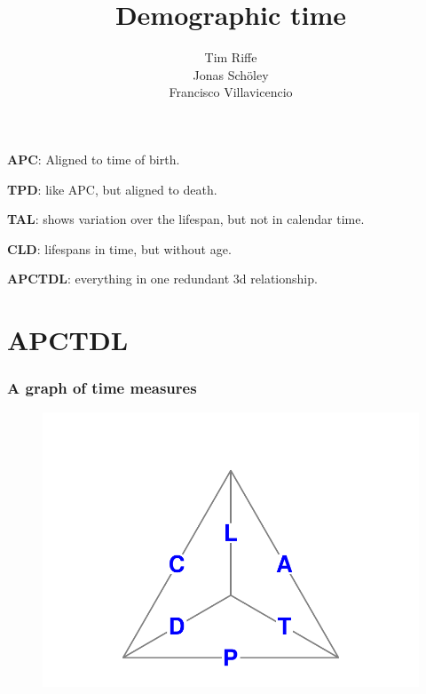 \documentclass[20pt]{beamer}
\title{Demographic time}
\subtitle{Tim Riffe\\ Jonas Sch{\"o}ley \\ Francisco Villavicencio}		%
\begin{document}
\begin{frame}
	\titlepage
\end{frame}

\begin{frame}%
  \begin{description}
    \item<1->{\textbf{APC}:} Aligned to time of birth.
    \item<2->{\textbf{TPD}:} like APC, but aligned to death.
    \item<3->{\textbf{TAL}:} shows variation over the lifespan, but not in
    calendar time.
    \item<4->{\textbf{CLD}:} lifespans in time, but without age.
    \item<5->{\textbf{APCTDL}:} everything in one redundant 3d relationship.
  \end{description}
\end{frame}

\section{APCTDL}
\begin{frame}
\frametitle{A graph of time measures}
\begin{figure}[b]
    \centering
    \includegraphics{Figures/Tetra1prg.pdf}
\end{figure} 
\end{frame}

\end{document}
